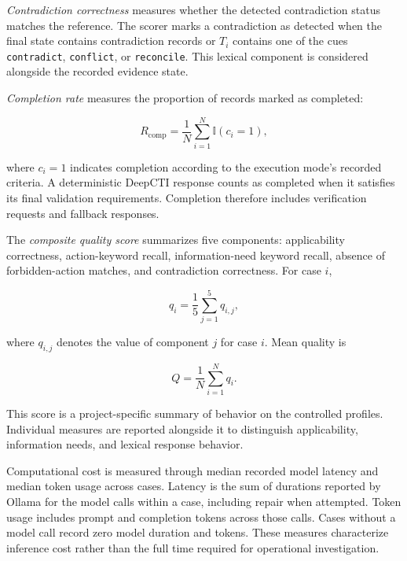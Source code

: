 \documentclass[conference]{IEEEtran}
\begin{document}
\textit{Contradiction correctness} measures whether the detected
contradiction status matches the reference. The scorer marks a
contradiction as detected when the final state contains contradiction
records or $T_i$ contains one of the cues \texttt{contradict},
\texttt{conflict}, or \texttt{reconcile}. This lexical component is
considered alongside the recorded evidence state.

\textit{Completion rate} measures the proportion of records marked as
completed:

\begin{equation}
R_{\mathrm{comp}}
=
\frac{1}{N}
\sum_{i=1}^{N}
\mathbb{I}(c_i=1),
\label{eq:completion_rate}
\end{equation}

where $c_i=1$ indicates completion according to the execution mode's
recorded criteria. A deterministic DeepCTI response counts as completed
when it satisfies its final validation requirements. Completion
therefore includes verification requests and fallback responses.

The \textit{composite quality score} summarizes five components:
applicability correctness, action-keyword recall, information-need
keyword recall, absence of forbidden-action matches, and contradiction
correctness. For case $i$,

\begin{equation}
q_i
=
\frac{1}{5}
\sum_{j=1}^{5}q_{i,j},
\label{eq:case_quality}
\end{equation}

where $q_{i,j}$ denotes the value of component $j$ for case $i$. Mean quality is

\begin{equation}
Q
=
\frac{1}{N}
\sum_{i=1}^{N}q_i.
\label{eq:mean_quality}
\end{equation}

This score is a project-specific summary of behavior on the controlled
profiles. Individual measures are reported alongside it to distinguish
applicability, information needs, and lexical response behavior.

Computational cost is measured through median recorded model latency
and median token usage across cases. Latency is the sum of durations
reported by Ollama for the model calls within a case, including repair
when attempted. Token usage includes prompt and completion tokens
across those calls. Cases without a model call record zero model
duration and tokens. These measures characterize inference cost rather
than the full time required for operational investigation.
\end{document}
